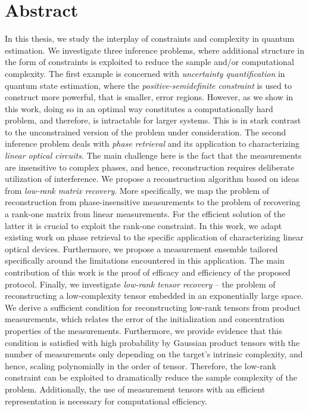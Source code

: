 \documentclass[
  a4paper,
  11pt,
  BCOR=8mm,
  twoside,
  headsepline]{scrbook}
\begin{document}
\chapter*{Abstract}
\setcounter{page}{3}

In this thesis, we study the interplay of constraints and complexity in quantum estimation.
We investigate three inference problems, where additional structure in the form of constraints is exploited to reduce the sample and/or computational complexity.
The first example is concerned with \emph{uncertainty quantification} in quantum state estimation, where the \emph{positive-semidefinite constraint} is used to construct more powerful, that is smaller, error regions.
However, as we show in this work, doing so in an optimal way constitutes a computationally hard problem, and therefore, is intractable for larger systems.
This is in stark contrast to the unconstrained version of the problem under consideration.
The second inference problem deals with \emph{phase retrieval} and its application to characterizing \emph{linear optical circuits}.
The main challenge here is the fact that the measurements are insensitive to complex phases, and hence, reconstruction requires deliberate utilization of interference.
We propose a reconstruction algorithm based on ideas from \emph{low-rank matrix recovery}.
More specifically, we map the problem of reconstruction from phase-insensitive measurements to the problem of recovering a rank-one matrix from linear measurements.
For the efficient solution of the latter it is crucial to exploit the rank-one constraint.
In this work, we adapt existing work on phase retrieval to the specific application of characterizing linear optical devices.
Furthermore, we propose a measurement ensemble tailored specifically around the limitations encountered in this application.
The main contribution of this work is the proof of efficacy and efficiency of the proposed protocol.
Finally, we investigate \emph{low-rank tensor recovery} -- the problem of reconstructing a low-complexity tensor embedded in an exponentially large space.
We derive a sufficient condition for reconstructing low-rank tensors from product measurements, which relates the error of the initialization and concentration properties of the measurements.
Furthermore, we provide evidence that this condition is satisfied with high probability by Gaussian product tensors with the number of measurements only depending on the target's intrinsic complexity, and hence, scaling polynomially in the order of tensor.
Therefore, the low-rank constraint can be exploited to dramatically reduce the sample complexity of the problem.
Additionally, the use of measurement tensors with an efficient representation is necessary for computational efficiency.
\end{document}
